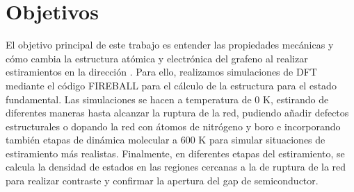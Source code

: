 \section{Objetivos}

El objetivo principal de este trabajo es entender las propiedades mecánicas y cómo cambia la estructura atómica y electrónica del grafeno al realizar estiramientos en la dirección \arm. Para ello, realizamos simulaciones de DFT mediante el código FIREBALL para el cálculo de la estructura para el estado fundamental. Las simulaciones se hacen a temperatura de 0 K, estirando de diferentes maneras hasta alcanzar la ruptura de la red, pudiendo añadir defectos estructurales o dopando la red con átomos de nitrógeno y boro e incorporando también etapas de dinámica molecular a 600 K para simular situaciones de estiramiento más realistas. Finalmente, en diferentes etapas del estiramiento, se calcula la densidad de estados en las regiones cercanas a la de ruptura de la red para realizar contraste y confirmar la apertura del gap de semiconductor. 